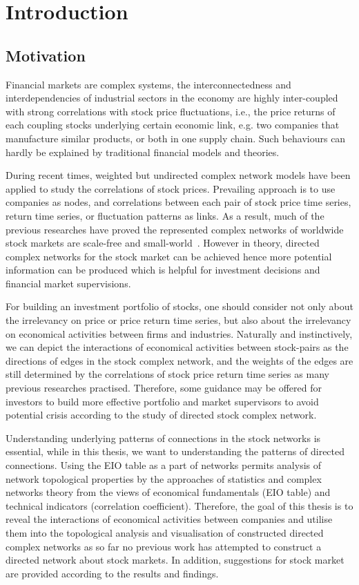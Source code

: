 \chapter{Introduction}
\section{Motivation}
Financial markets are complex systems, the interconnectedness and interdependencies of industrial sectors in the economy are highly inter-coupled with strong correlations with stock price fluctuations, i.e., the price returns of each coupling stocks underlying certain economic link, e.g. two companies that manufacture similar products, or both in one supply chain. Such behaviours can hardly be explained by traditional financial models and theories.

During recent times, weighted but undirected complex network models have been applied to study the correlations of stock prices. Prevailing approach is to use companies as nodes, and correlations between each pair of stock price time series, return time series, or fluctuation patterns as links. As a result, much of the previous researches have proved the represented complex networks of worldwide stock markets are scale-free and small-world~\cite{cnsm, perspective}. However in theory, directed complex networks for the stock market can be achieved hence more potential information can be produced which is helpful for investment decisions and financial market supervisions.

For building an investment portfolio of stocks, one should consider not only about the irrelevancy on price or price return time series, but also about the irrelevancy on economical activities between firms and industries. Naturally and instinctively, we can depict the interactions of economical activities between stock-pairs as the directions of edges in the stock complex network, and the weights of the edges are still determined by the correlations of stock price return time series as many previous researches practised. Therefore, some guidance may be offered for investors to build more effective portfolio and market supervisors to avoid potential crisis according to the study of directed stock complex network.

Understanding underlying patterns of connections in the stock networks is essential, while in this thesis, we want to understanding the patterns of directed connections. Using the EIO table as a part of networks permits analysis of network topological properties by the approaches of statistics and complex networks theory from the views of economical fundamentals (EIO table) and technical indicators (correlation coefficient). Therefore, the goal of this thesis is to reveal the interactions of economical activities between companies and utilise them into the topological analysis and visualisation of constructed directed complex networks as so far no previous work has attempted to construct a directed network about stock markets. In addition, suggestions for stock market are provided according to the results and findings.

